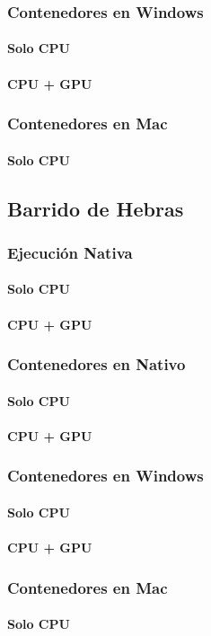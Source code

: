 \subsubsection{Contenedores en Windows}
\paragraph{Solo CPU}

\paragraph{CPU + GPU}

\subsubsection{Contenedores en Mac}
\paragraph{Solo CPU}

\subsection{Barrido de Hebras}\subsubsection{Ejecución Nativa}
\paragraph{Solo CPU}

\paragraph{CPU + GPU}

\subsubsection{Contenedores en Nativo}
\paragraph{Solo CPU}

\paragraph{CPU + GPU}

\subsubsection{Contenedores en Windows}
\paragraph{Solo CPU}

\paragraph{CPU + GPU}

\subsubsection{Contenedores en Mac}
\paragraph{Solo CPU}

